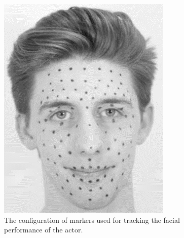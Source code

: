 \begin{figure}[htbp!]
\begin{minipage}[b]{0.47\textwidth}
\centering
\includegraphics[width=\textwidth]{img/facemarkers}
	\caption{ The configuration of markers used for tracking the facial performance of the actor.}
	\label{fig:facemarkers}
\end{minipage}
\hfill
\begin{minipage}[b]{0.5\textwidth}
\centering

\end{minipage}
\end{figure}
